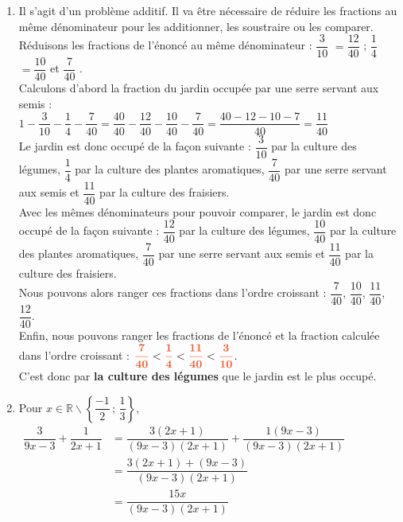 \documentclass[a4paper,11pt]{article}
\begin{document}
\begin{seance}{}
\begin{enumerate}
\item Il s'agit d'un problème additif. Il va être nécessaire de réduire les fractions au même dénominateur pour les additionner, les soustraire ou les comparer.\\Réduisons les fractions de l'énoncé au même dénominateur :  $\dfrac{3}{10}$ $= \dfrac{12}{40}$ ; $\dfrac{1}{4}$ $= \dfrac{10}{40}$ et $\dfrac{7}{40}$ .\\Calculons d'abord la fraction du jardin occupée par une serre servant aux semis : \\$1-\dfrac{3}{10}-\dfrac{1}{4}-\dfrac{7}{40} = \dfrac{40}{40}-\dfrac{12}{40}-\dfrac{10}{40}-\dfrac{7}{40} = \dfrac{40-12-10-7}{40} = \dfrac{11}{40}$\\Le jardin est donc occupé de la façon suivante : $\dfrac{3}{10}$ par la culture des légumes, $\dfrac{1}{4}$ par la culture des plantes aromatiques, $\dfrac{7}{40}$ par une serre servant aux semis et $\dfrac{11}{40}$ par la culture des fraisiers.\\ Avec les mêmes dénominateurs pour pouvoir comparer, le jardin est donc occupé de la façon suivante : $\dfrac{12}{40}$ par la culture des légumes, $\dfrac{10}{40}$ par la culture des plantes aromatiques, $\dfrac{7}{40}$ par une serre servant aux semis et $\dfrac{11}{40}$ par la culture des fraisiers.\\Nous pouvons alors ranger ces fractions dans l'ordre croissant : $\dfrac{7}{40}$, $\dfrac{10}{40}$, $\dfrac{11}{40}$, $\dfrac{12}{40}$.\\Enfin, nous pouvons ranger les fractions de l'énoncé et la fraction calculée dans l'ordre croissant : ${\color[HTML]{f15929}\boldsymbol{\dfrac{7}{40}}} < {\color[HTML]{f15929}\boldsymbol{\dfrac{1}{4}}} < {\color[HTML]{f15929}\boldsymbol{\dfrac{11}{40}}} < {\color[HTML]{f15929}\boldsymbol{\dfrac{3}{10}}}$.\\ 
                      C'est donc par {\bfseries \color[HTML]{f15929}la culture des légumes} que le jardin est le plus occupé.


\item
            Pour $x\in \mathbb{R}\smallsetminus\left\{\dfrac{-1}{2}\,;\,\dfrac{1}{3}\right\}$, \\
            $\begin{aligned}
            \dfrac{3}{9x-3}+\dfrac{1}{2x+1}
            &= \dfrac{3(2x+1)}{(9x-3)(2x+1)}+\dfrac{1(9x-3)}{(9x-3)(2x+1)}\\
            &=\dfrac{3(2x+1)+(9x-3)}{(9x-3)(2x+1)}\\
            &=\dfrac{15x}{(9x-3)(2x+1)}
            \end{aligned}$



\end{enumerate}
\end{seance}
\end{document}
